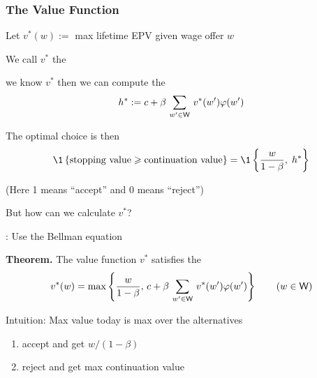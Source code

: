 \begin{frame}
    \frametitle{The Value Function}

    Let  $v^*(w) :=$ max lifetime EPV given wage offer $w$
    \vspace{0.4em}

    We call $v^*$ the 
    \vspace{0.4em}

     we know $v^*$ then we can compute the  
    \begin{equation*}
        h^* 
        := c + \beta \, \sum_{w' \in \mathsf W} \, v^*(w') \varphi(w') 
    \end{equation*}

    The optimal choice is then
    \begin{equation*}
         \1
        \left\{
            \text{stopping value} \geq \text{continuation value}
        \right\}
         = \1
        \left\{
            \frac{w}{1 - \beta}, \; h^*
        \right\}
    \end{equation*}


    (Here 1 means ``accept'' and 0 means ``reject'')

\end{frame}


\begin{frame}

    But how can we calculate $v^*$?

    \vspace{0.4em}
    : Use the Bellman equation 

    \vspace{0.4em}
    {\bf Theorem.} The value function $v^*$ satisfies the 
    \begin{equation*}
        v^*(w) = 
        \max \left\{
            \frac{w}{1-\beta}
            ,\,
            c + \beta \, \sum_{w' \in \mathsf W} \, v^*(w') \varphi(w')
            \right\}
            \qquad (w \in \mathsf W)
    \end{equation*}

    \vspace{0.4em}
    \vspace{0.4em}
    \vspace{0.4em}
    Intuition: Max value today is max over the alternatives
    \begin{enumerate}
        \item accept and get $w/(1-\beta)$
        \vspace{0.4em}
        \item reject and get max continuation value
    \end{enumerate}


\end{frame}


